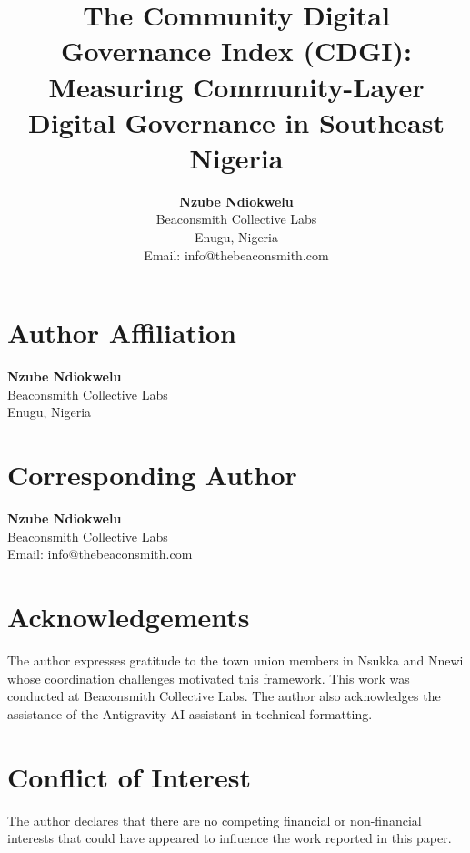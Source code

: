 \documentclass[12pt]{article}
\title{The Community Digital Governance Index (CDGI): Measuring Community-Layer Digital Governance in Southeast Nigeria}
\author{
    \textbf{Nzube Ndiokwelu} \\
    Beaconsmith Collective Labs \\
    Enugu, Nigeria \\
    Email: info@thebeaconsmith.com
}
\date{}
\begin{document}
\maketitle

\thispagestyle{empty}

\section*{Author Affiliation}
\textbf{Nzube Ndiokwelu} \\
Beaconsmith Collective Labs \\
Enugu, Nigeria

\section*{Corresponding Author}
\textbf{Nzube Ndiokwelu} \\
Beaconsmith Collective Labs \\
Email: info@thebeaconsmith.com

\section*{Acknowledgements}
The author expresses gratitude to the town union members in Nsukka and Nnewi whose coordination challenges motivated this framework. This work was conducted at Beaconsmith Collective Labs. The author also acknowledges the assistance of the Antigravity AI assistant in technical formatting.

\section*{Conflict of Interest}
The author declares that there are no competing financial or non-financial interests that could have appeared to influence the work reported in this paper.
\end{document}
